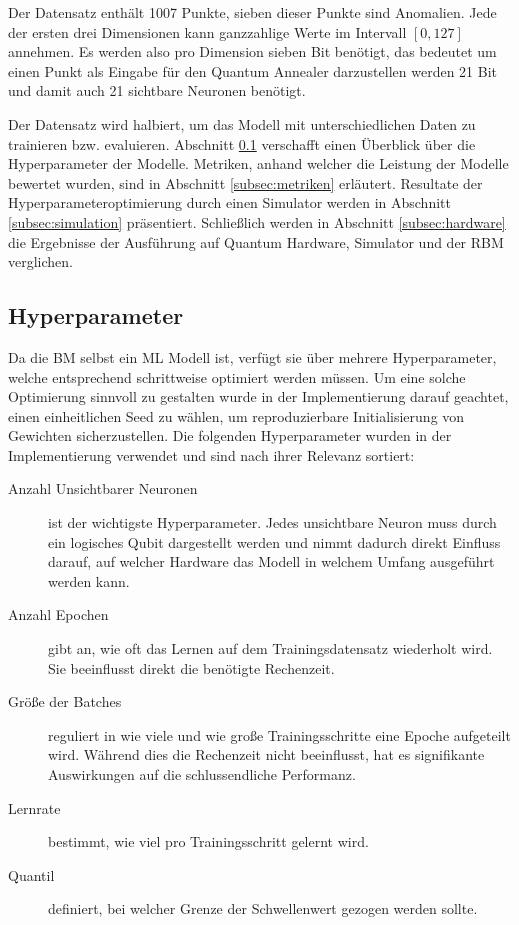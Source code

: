 Der Datensatz enthält 1007 Punkte, sieben dieser Punkte sind Anomalien. Jede der ersten drei Dimensionen kann ganzzahlige
Werte im Intervall $[0,127]$ annehmen. Es werden also pro Dimension sieben Bit benötigt, das bedeutet um einen Punkt als
Eingabe für den Quantum Annealer darzustellen werden 21 Bit und damit auch 21 sichtbare Neuronen benötigt.

Der Datensatz wird halbiert, um das Modell mit unterschiedlichen Daten zu trainieren bzw. evaluieren.
Abschnitt \ref{subsec:hyperparameter} verschafft einen Überblick über die Hyperparameter der Modelle. Metriken, anhand welcher
die Leistung der Modelle bewertet wurden, sind in Abschnitt \ref{subsec:metriken} erläutert. Resultate der Hyperparameteroptimierung
durch einen Simulator werden in Abschnitt \ref{subsec:simulation} präsentiert. Schließlich werden in Abschnitt \ref{subsec:hardware} die
Ergebnisse der Ausführung auf Quantum Hardware, Simulator und der RBM verglichen.

\subsection{Hyperparameter}
\label{subsec:hyperparameter}
Da die BM selbst ein ML Modell ist, verfügt sie über mehrere Hyperparameter, welche entsprechend schrittweise optimiert werden müssen.
Um eine solche Optimierung sinnvoll zu gestalten wurde in der Implementierung darauf geachtet, einen einheitlichen Seed zu wählen, um reproduzierbare 
Initialisierung von Gewichten sicherzustellen. Die folgenden Hyperparameter wurden in der Implementierung verwendet und sind nach ihrer Relevanz sortiert:

\begin{description}
    \item[Anzahl Unsichtbarer Neuronen] ist der wichtigste Hyperparameter. Jedes unsichtbare
    Neuron muss durch ein logisches Qubit dargestellt werden und nimmt dadurch direkt
    Einfluss darauf, auf welcher Hardware das Modell in welchem Umfang ausgeführt
    werden kann.
    
    \item[Anzahl Epochen] gibt an, wie oft das Lernen auf dem Trainingsdatensatz wiederholt
    wird. Sie beeinflusst direkt die benötigte Rechenzeit.
    
    \item[Größe der Batches] reguliert in wie viele und wie große Trainingsschritte eine
    Epoche aufgeteilt wird. Während dies die Rechenzeit nicht beeinflusst, hat es
    signifikante Auswirkungen auf die schlussendliche Performanz.
    
    \item[Lernrate] bestimmt, wie viel pro Trainingsschritt gelernt wird.
    
    \item[Quantil] definiert, bei welcher Grenze der Schwellenwert gezogen werden sollte.
\end{description}

